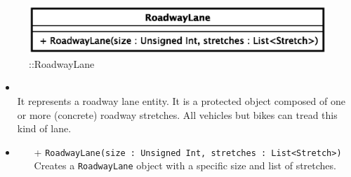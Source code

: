 \begin{figure}[h]
\centering
\includegraphics[scale=0.6,keepaspectratio]{images/solution/app/backend/roadway_lane.eps}
\caption{\pReactiveComponentLane::RoadwayLane}
\label{fig:sd-app-roadway_lane}
\end{figure}
\FloatBarrier
\begin{itemize}
  \item \textbf{\descr} \\
    It represents a roadway lane entity. It is a protected object composed of
    one or more (concrete) roadway stretches. All vehicles but bikes can tread
    this kind of lane.
  \item \textbf{\ops}
  \begin{itemize}
  \item[+] \texttt{RoadwayLane(size : Unsigned Int, stretches : List<Stretch>)} \\
  Creates a \texttt{RoadwayLane} object with a specific size and list of stretches.
  \end{itemize}   
\end{itemize}
